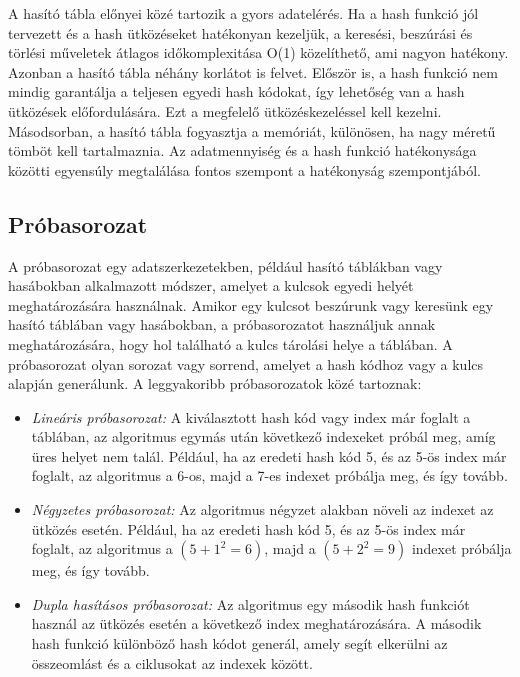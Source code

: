 \documentclass[margin=0px]{article}
\begin{document}
A hasító tábla előnyei közé tartozik a gyors adatelérés. Ha a hash funkció jól tervezett és a hash ütközéseket hatékonyan kezeljük, a keresési, beszúrási és törlési műveletek átlagos időkomplexitása O(1) közelíthető, ami nagyon hatékony.
Azonban a hasító tábla néhány korlátot is felvet. Először is, a hash funkció nem mindig garantálja a teljesen egyedi hash kódokat, így lehetőség van a hash ütközések előfordulására. Ezt a megfelelő ütközéskezeléssel kell kezelni. Másodsorban, a hasító tábla fogyasztja a memóriát, különösen, ha nagy méretű tömböt kell tartalmaznia. Az adatmennyiség és a hash funkció hatékonysága közötti egyensúly megtalálása fontos szempont a hatékonyság szempontjából.

\subsection{Próbasorozat}
A próbasorozat egy adatszerkezetekben, például hasító táblákban vagy hasábokban alkalmazott módszer, amelyet a kulcsok egyedi helyét meghatározására használnak.
Amikor egy kulcsot beszúrunk vagy keresünk egy hasító táblában vagy hasábokban, a próbasorozatot használjuk annak meghatározására, hogy hol található a kulcs tárolási helye a táblában.
A próbasorozat olyan sorozat vagy sorrend, amelyet a hash kódhoz vagy a kulcs alapján generálunk.
A leggyakoribb próbasorozatok közé tartoznak:
\begin{itemize}
    \item \textit{Lineáris próbasorozat:} A kiválasztott hash kód vagy index már foglalt a táblában, az algoritmus egymás után következő indexeket próbál meg, amíg üres helyet nem talál. Például, ha az eredeti hash kód 5, és az 5-ös index már foglalt, az algoritmus a 6-os, majd a 7-es indexet próbálja meg, és így tovább.
    \item \textit{Négyzetes próbasorozat:} Az algoritmus négyzet alakban növeli az indexet az ütközés esetén. Például, ha az eredeti hash kód 5, és az 5-ös index már foglalt, az algoritmus a $(5+1^2 = 6)$, majd a $(5+2^2 = 9)$ indexet próbálja meg, és így tovább.
    \item \textit{Dupla hasításos próbasorozat:} Az algoritmus egy második hash funkciót használ az ütközés esetén a következő index meghatározására. A második hash funkció különböző hash kódot generál, amely segít elkerülni az összeomlást és a ciklusokat az indexek között.
\end{itemize}
\end{document}
